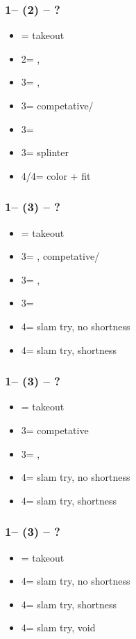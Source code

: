 \subsubsection*{1\hearts -- (2\spades) -- ?}
\begin{itemize}
    \item \dbl = takeout
    \item 2\nt = \clubs, \invp
    \item 3\clubs = \diams, \invp
    \item 3\diams = \hearts competative/\gf
    \item 3\hearts = \hearts\ \inv
    \item 3\spades = splinter
    \item 4\clubs/4\diams = color + fit
\end{itemize}

\subsubsection*{1\hearts -- (3\clubs) -- ?}
\begin{itemize}
    \item \dbl = takeout
    \item 3\diams = \hearts, competative/\gf
    \item 3\hearts = \hearts, \inv
    \item 3\spades = \spades\ \gf
    \item 4\clubs = slam try, no \clubs shortness
    \item 4\diams = slam try, \clubs shortness
\end{itemize}

\subsubsection*{1\hearts -- (3\diams) -- ?}
\begin{itemize}
    \item \dbl = takeout
    \item 3\hearts = competative
    \item 3\spades = \spades, \gf
    \item 4\clubs = slam try, no \diams shortness
    \item 4\diams = slam try, \diams shortness
\end{itemize}

\subsubsection*{1\hearts -- (3\spades) -- ?}
\begin{itemize}
    \item \dbl = takeout
    \item 4\clubs = slam try, no \spades shortness
    \item 4\diams = slam try, \spades shortness
    \item 4\spades = slam try, \spades void
\end{itemize}

